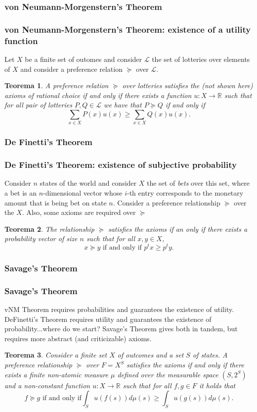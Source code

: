 \documentclass{beamer}
\theoremstyle{plain}
\newtheorem{teo}{Teorema}
\begin{document}
		\subsubsection{von Neumann-Morgenstern's Theorem}
		\begin{frame}
		\frametitle{von Neumann-Morgenstern's Theorem: existence of a utility function}
		Let $X$ be a finite set of outomes and consider $\mathcal{L}$ the set of lotteries over elements of $X$ and consider a preference relation $\succeq$ over $\mathcal{L}$.
		\begin{teo}
		A preference relation $\succeq$ over lotteries satisfies the (not shown here) axioms of rational choice if and only if there exists a function $u: X \to \mathbb{R}$ such that for all pair of lotteries $P,Q \in \mathcal{L}$ we have that $P \succeq Q$ if and only if 
		\[ \sum_{x \in X} P(x) u(x) \geq \sum_{x \in X} Q(x) u(x).  \]
		\end{teo}
		\end{frame}
		\subsubsection{De Finetti's Theorem}
		\begin{frame}
		\frametitle{De Finetti's Theorem: existence of subjective probability}
		Consider $n$ states of the world and consider $X$ the set of \textit{bets} over this set, where a bet is an $n$-dimensional vector whose $i$-th entry corresponds to the monetary amount that is being bet on state $n$. Consider a preference relationship $\succeq$ over the $X$. Also, some axioms are required over $\succeq$
		\begin{teo}
		The relationship $\succeq$ satisfies the axioms if an only if there exists a probability vector of size $n$ such that for all $x,y \in X$,
		\[ x \succeq y \textrm { if and only if } p^t x \geq p^t y. \]
		\end{teo}
		\end{frame}
		\subsubsection{Savage's Theorem}
		\begin{frame}
		\frametitle{Savage's Theorem}
		vNM Theorem requires probabilities and guarantees the existence of utility. DeFinetti's Theorem requires utility and guarantees the existence of probability...where do we start? Savage's Theorem gives both in tandem, but requires more abstract (and criticizable) axioms.
		\begin{teo}
		Consider a finite set $X$ of outcomes and a set $S$ of states.  A preference relationship $\succeq$ over $F=X^S$ satisfies the axioms if and only if there exists a finite non-atomic measure $\mu$ defined over the measurable space $(S, 2^S)$ and a non-constant function $u :X \to \mathbb{R}$ such that for all $f,g \in F$ it holds that
		\[ f \succeq g \textrm{ if and only if} \int_S u(f(s)) d \mu(s) \geq \int_S u(g(s)) d \mu(s). \]
		\end{teo}
		\end{frame}
		
\end{document}
